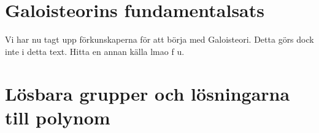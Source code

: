 \documentclass{article}
\theoremstyle{definition}
\begin{document}
\section{Galoisteorins fundamentalsats}
Vi har nu tagt upp förkunskaperna för att börja med Galoisteori. Detta görs dock inte i detta text. Hitta en annan källa lmao f u.
\section{Lösbara grupper och lösningarna till polynom}
\end{document}
